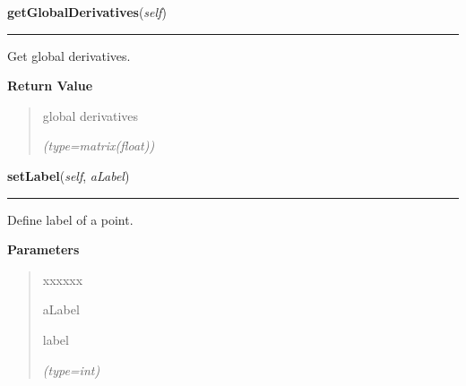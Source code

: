     \label{gblfit:GblPoint:getGlobalDerivatives}

    \vspace{0.5ex}

\hspace{.8\funcindent}\begin{boxedminipage}{\funcwidth}

    \raggedright \textbf{getGlobalDerivatives}(\textit{self})

    \vspace{-1.5ex}

    \rule{\textwidth}{0.5\fboxrule}
\setlength{\parskip}{2ex}
    Get global derivatives.

\setlength{\parskip}{1ex}
      \textbf{Return Value}
    \vspace{-1ex}

      \begin{quote}
      global derivatives

      {\it (type=matrix(float))}

      \end{quote}

    \end{boxedminipage}

    \label{gblfit:GblPoint:setLabel}

    \vspace{0.5ex}

\hspace{.8\funcindent}\begin{boxedminipage}{\funcwidth}

    \raggedright \textbf{setLabel}(\textit{self}, \textit{aLabel})

    \vspace{-1.5ex}

    \rule{\textwidth}{0.5\fboxrule}
\setlength{\parskip}{2ex}
    Define label of a point.

\setlength{\parskip}{1ex}
      \textbf{Parameters}
      \vspace{-1ex}

      \begin{quote}
        \begin{Ventry}{xxxxxx}

          \item[aLabel]

          label

            {\it (type=int)}

        \end{Ventry}

      \end{quote}

    \end{boxedminipage}


